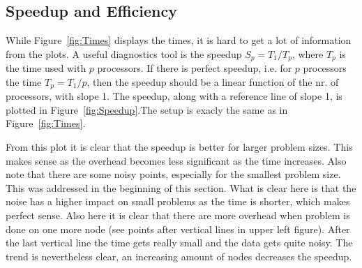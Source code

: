 \subsection{Speedup and Efficiency}
While Figure~\ref{fig:Times} displays the times, it is hard to get a lot of information from the plots. A useful diagnostics tool is the speedup $S_p=T_1/T_p$, where $T_p$ is the time used with $p$ processors. If there is perfect speedup, i.e. for $p$ processors the time $T_p = T_1/p$, then the speedup should be a linear function of the nr. of processors, with slope 1. The speedup, along with a reference line of slope 1, is plotted in Figure~\ref{fig:Speedup}.The setup is exacly the same as in Figure~\ref{fig:Times}.

From this plot it is clear that the speedup is better for larger problem sizes. This makes sense as the overhead becomes less significant as the time increases. Also note that there are some noisy points, especially for the smallest problem size. This was addressed in the beginning of this section. What is clear here is that the noise has a higher impact on small problems as the time is shorter, which makes perfect sense. Also here it is clear that there are more overhead when problem is done on one more node (see points after vertical lines in upper left figure). After the last vertical line the time gets really small and the data gets quite noisy.
The trend is nevertheless clear, an increasing amount of nodes decreases the speedup. \\
%
